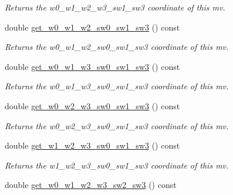 \begin{DoxyCompactItemize}
\begin{DoxyCompactList}\small\item\em Returns the w0\-\_\-w1\-\_\-w2\-\_\-w3\-\_\-sw1\-\_\-sw3 coordinate of this mv. \end{DoxyCompactList}\item 
\hypertarget{classe3ga_1_1mv_afba0c207f0ede50d9619b83203379004}{double \hyperlink{classe3ga_1_1mv_afba0c207f0ede50d9619b83203379004}{get\-\_\-w0\-\_\-w1\-\_\-w2\-\_\-sw0\-\_\-sw1\-\_\-sw3} () const }\label{classe3ga_1_1mv_afba0c207f0ede50d9619b83203379004}

\begin{DoxyCompactList}\small\item\em Returns the w0\-\_\-w1\-\_\-w2\-\_\-sw0\-\_\-sw1\-\_\-sw3 coordinate of this mv. \end{DoxyCompactList}\item 
\hypertarget{classe3ga_1_1mv_abef9af81c63ad44e4384ca2601db740c}{double \hyperlink{classe3ga_1_1mv_abef9af81c63ad44e4384ca2601db740c}{get\-\_\-w0\-\_\-w1\-\_\-w3\-\_\-sw0\-\_\-sw1\-\_\-sw3} () const }\label{classe3ga_1_1mv_abef9af81c63ad44e4384ca2601db740c}

\begin{DoxyCompactList}\small\item\em Returns the w0\-\_\-w1\-\_\-w3\-\_\-sw0\-\_\-sw1\-\_\-sw3 coordinate of this mv. \end{DoxyCompactList}\item 
\hypertarget{classe3ga_1_1mv_a3ddd9662ebf1afc9528d7a1e500f8a75}{double \hyperlink{classe3ga_1_1mv_a3ddd9662ebf1afc9528d7a1e500f8a75}{get\-\_\-w0\-\_\-w2\-\_\-w3\-\_\-sw0\-\_\-sw1\-\_\-sw3} () const }\label{classe3ga_1_1mv_a3ddd9662ebf1afc9528d7a1e500f8a75}

\begin{DoxyCompactList}\small\item\em Returns the w0\-\_\-w2\-\_\-w3\-\_\-sw0\-\_\-sw1\-\_\-sw3 coordinate of this mv. \end{DoxyCompactList}\item 
\hypertarget{classe3ga_1_1mv_aae09554f29ca201cd17f261559417ba4}{double \hyperlink{classe3ga_1_1mv_aae09554f29ca201cd17f261559417ba4}{get\-\_\-w1\-\_\-w2\-\_\-w3\-\_\-sw0\-\_\-sw1\-\_\-sw3} () const }\label{classe3ga_1_1mv_aae09554f29ca201cd17f261559417ba4}

\begin{DoxyCompactList}\small\item\em Returns the w1\-\_\-w2\-\_\-w3\-\_\-sw0\-\_\-sw1\-\_\-sw3 coordinate of this mv. \end{DoxyCompactList}\item 
\hypertarget{classe3ga_1_1mv_a7912c0e33615cb08daf39b5848c6dc85}{double \hyperlink{classe3ga_1_1mv_a7912c0e33615cb08daf39b5848c6dc85}{get\-\_\-w0\-\_\-w1\-\_\-w2\-\_\-w3\-\_\-sw2\-\_\-sw3} () const }\label{classe3ga_1_1mv_a7912c0e33615cb08daf39b5848c6dc85}


\end{DoxyCompactItemize}
